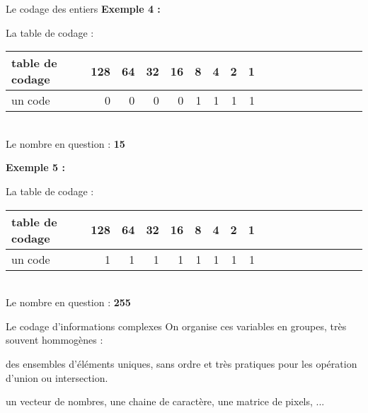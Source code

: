 \begin{frame}{Le codage des entiers}
    \textbf{Exemple 4 :}
    \begin{center}
        La table de codage : \\
        $\;$\\
        \begin{tabular}{|*{2}{l||r|r|r|r|r|r|r|r|}}
            \hline
                table de codage & 128 & 64 & 32 & 16 & 8 & 4 & 2 & 1 \\
            \hline
                un code         & 0   & 0  & 0  & 0  & 1 & 1 & 1 & 1 \\
            \hline
        \end{tabular} \\
        $\;$\\
        Le nombre en question : \textbf{15} \\
    \end{center}
    \textbf{Exemple 5 :}
    \begin{center}
        La table de codage : \\
        $\;$\\
        \begin{tabular}{|*{2}{l||r|r|r|r|r|r|r|r|}}
            \hline
                table de codage & 128 & 64 & 32 & 16 & 8 & 4 & 2 & 1 \\
            \hline
                un code         & 1   & 1  & 1  & 1  & 1 & 1 & 1 & 1 \\
            \hline
        \end{tabular} \\
        $\;$\\
        Le nombre en question : \textbf{255} \\
    \end{center}
\end{frame}

\begin{frame}{Le codage d'informations complexes}
    On organise ces variables en groupes, très souvent hommogènes :
    \begin{description}[<+->]
        \item [Les COLLECTIONS] des ensembles d'éléments uniques, sans ordre et très pratiques pour les opération d'union ou intersection.
        \item [Les LISTES] un vecteur de nombres, une chaine de caractère, une matrice de pixels, ...
        \item [ETC ...]
    \end{description}
\end{frame}
